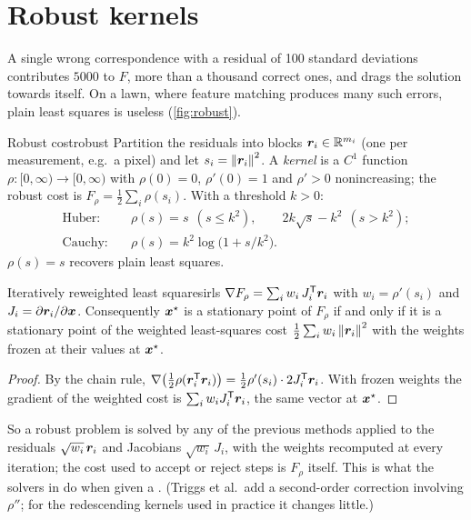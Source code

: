 \section{Robust kernels}

A single wrong correspondence with a residual of 100 standard deviations
contributes $5000$ to $F$, more than a thousand correct ones, and drags
the solution towards itself. On a lawn, where feature matching produces
many such errors, plain least squares is useless (\cref{fig:robust}).

\begin{definition}{Robust cost}{robust}
Partition the residuals into blocks $\bm{r}_i\in\mathbb{R}^{m_i}$ (one per
measurement, e.g.\ a pixel) and let $s_i=\left\lVert \bm{r}_i\right\rVert^2$. A
\emph{kernel} is a $C^1$ function $\rho:[0,\infty)\to[0,\infty)$ with
$\rho(0)=0$, $\rho'(0)=1$ and $\rho'>0$ nonincreasing; the robust cost is
$F_\rho=\tfrac12\sum_i\rho(s_i)$. With a threshold $k>0$:
\begin{align*}
\text{Huber:}&\quad\rho(s)=s\ \ (s\le k^2),\qquad 2k\sqrt{s}-k^2\ \
(s>k^2);\\
\text{Cauchy:}&\quad\rho(s)=k^2\log\bigl(1+s/k^2\bigr).
\end{align*}
$\rho(s)=s$ recovers plain least squares.
\end{definition}

\begin{proposition}{Iteratively reweighted least squares}{irls}
$\nabla F_\rho=\sum_iw_i\,J_i^{\mathsf{T}}\bm{r}_i$ with $w_i=\rho'(s_i)$ and
$J_i=\partial\bm{r}_i/\partial\bm{x}$. Consequently $\bm{x}^\star$ is a
stationary point of $F_\rho$ if and only if it is a stationary point of
the weighted least-squares cost $\tfrac12\sum_iw_i\left\lVert \bm{r}_i\right\rVert^2$
with the weights frozen at their values at $\bm{x}^\star$.
\end{proposition}

\begin{proof}
By the chain rule,
$\nabla\bigl(\tfrac12\rho(\bm{r}_i^{\mathsf{T}}\bm{r}_i)\bigr)=\tfrac12\rho'(
s_i)\cdot2J_i^{\mathsf{T}}\bm{r}_i$. With frozen weights the gradient of the
weighted cost is $\sum_iw_iJ_i^{\mathsf{T}}\bm{r}_i$, the same vector at
$\bm{x}^\star$.
\end{proof}

So a robust problem is solved by any of the previous methods applied to
the residuals $\sqrt{w_i}\,\bm{r}_i$ and Jacobians $\sqrt{w_i}\,J_i$,
with the weights recomputed at every iteration; the cost used to accept
or reject steps is $F_\rho$ itself. This is what the solvers in
 do when given a . (Triggs et al.\ add a
second-order correction involving $\rho''$; for the redescending kernels
used in practice it changes little.)

